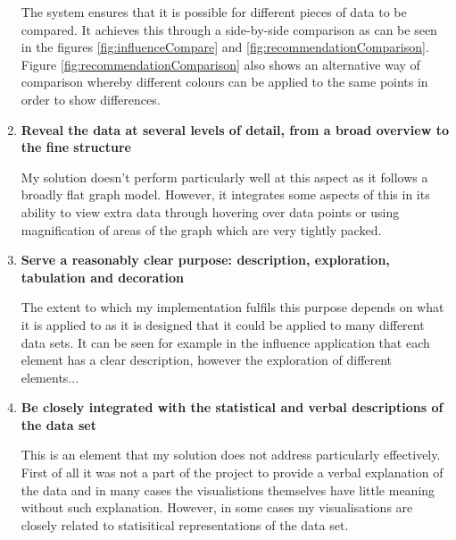 \documentclass[12pt,a4paper]{article}
\begin{document}
\begin{enumerate}
The system ensures that it is possible for different pieces of data to be compared. It achieves this through a side-by-side comparison as can be seen in the figures \ref{fig:influenceCompare} and \ref{fig:recommendationComparison}. Figure \ref{fig:recommendationComparison} also shows an alternative way of comparison whereby different colours can be applied to the same points in order to show differences.

\item {\bf Reveal the data at several levels of detail, from a broad overview to the fine structure}

My solution doesn't perform particularly well at this aspect as it follows a broadly flat graph model. However, it integrates some aspects of this in its ability to view extra data through hovering over data points or using magnification of areas of the graph which are very tightly packed.

\item {\bf Serve a reasonably clear purpose: description, exploration, tabulation and decoration}

The extent to which my implementation fulfils this purpose depends on what it is applied to as it is designed that it could be applied to many different data sets. It can be seen for example in the influence application that each element has a clear description, however the exploration of different elements...

\item {\bf Be closely integrated with the statistical and verbal descriptions of the data set}

This is an element that my solution does not address particularly effectively. First of all it was not a part of the project to provide a verbal explanation of the data and in many cases the visualistions themselves have little meaning without such explanation. However, in some cases my visualisations are closely related to statisitical representations of the data set.
\end{enumerate}
\end{document}
